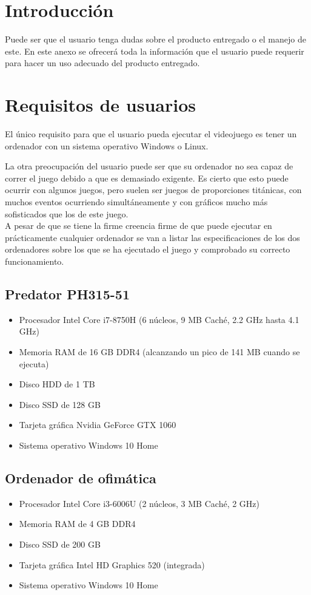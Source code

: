 
\section{Introducción}
Puede ser que el usuario tenga dudas sobre el producto entregado o el manejo de este. En este anexo se ofrecerá toda la información que el usuario puede requerir para hacer un uso adecuado del producto entregado.

\section{Requisitos de usuarios}
El único requisito para que el usuario pueda ejecutar el videojuego es tener un ordenador con un sistema operativo Windows o Linux.

La otra preocupación del usuario puede ser que su ordenador no sea capaz de correr el juego debido a que es demasiado exigente. Es cierto que esto puede ocurrir con algunos juegos, pero suelen ser juegos de proporciones titánicas, con muchos eventos ocurriendo simultáneamente y con gráficos mucho más sofisticados que los de este juego.\\
A pesar de que se tiene la firme creencia firme de que puede ejecutar en prácticamente cualquier ordenador se van a listar las especificaciones de los dos ordenadores sobre los que se ha ejecutado el juego y comprobado su correcto funcionamiento.

\subsection{Predator PH315-51}
\begin{itemize}
\item
Procesador Intel Core i7-8750H (6 núcleos, 9 MB Caché, 2.2 GHz hasta 4.1 GHz)
\item
Memoria RAM de 16 GB DDR4 (alcanzando un pico de 141 MB cuando se ejecuta)
\item
Disco HDD de 1 TB
\item
Disco SSD de 128 GB
\item
Tarjeta gráfica Nvidia GeForce GTX 1060
\item
Sistema operativo Windows 10 Home
\end{itemize}

\subsection{Ordenador de ofimática}
\begin{itemize}
\item
Procesador Intel Core i3-6006U (2 núcleos, 3 MB Caché, 2 GHz)
\item
Memoria RAM de 4 GB DDR4
\item
Disco SSD de 200 GB
\item
Tarjeta gráfica Intel HD Graphics 520 (integrada)
\item
Sistema operativo Windows 10 Home
\end{itemize}

